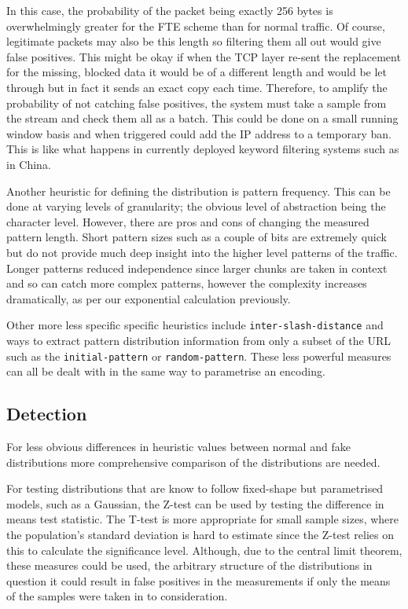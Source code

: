 \documentclass[ %
                    author={Samuel Russell},
                supervisor={Prof. Bogdan Warinschi},
                    degree={MEng},
                     title={Innocuous Ciphertexts},
                  subtitle={The DE-CENSOR Scheme},
                      type={research},
                      year={2018} ]{dissertation}
\begin{document}
In this case, the probability of the packet being exactly 256 bytes is overwhelmingly greater for the FTE scheme than for normal traffic.
Of course, legitimate packets may also be this length so filtering them all out would give false positives.
This might be okay if when the TCP layer re-sent the replacement for the missing, blocked data it would be of a different length and would be let through but in fact it sends an exact copy each time.
Therefore, to amplify the probability of not catching false positives, the system must take a sample from the stream and check them all as a batch.
This could be done on a small running window basis and when triggered could add the IP address to a temporary ban.
This is like what happens in currently deployed keyword filtering systems such as in China. 

Another heuristic for defining the distribution is pattern frequency.
This can be done at varying levels of granularity; the obvious level of abstraction being the character level. However, there are pros and cons of changing the measured pattern length.
Short pattern sizes such as a couple of bits are extremely quick but do not provide much deep insight into the higher level patterns of the traffic.
Longer patterns reduced independence since larger chunks are taken in context and so can catch more complex patterns, however the complexity increases dramatically, as per our exponential calculation previously.

Other more less specific specific heuristics include \texttt{inter-slash-distance} and ways to extract pattern distribution information from only a subset of the URL such as the \texttt{initial-pattern} or \texttt{random-pattern}. These less powerful measures can all be dealt with in the same way to parametrise an encoding.

\subsection{Detection}

For less obvious differences in heuristic values between normal and fake distributions more comprehensive comparison of the distributions are needed.

For testing distributions that are know to follow fixed-shape but parametrised models, such as a Gaussian, the Z-test can be used by testing the difference in means test statistic.
The T-test is more appropriate for small sample sizes, where the population's standard deviation is hard to estimate since the Z-test relies on this to calculate the significance level.
Although, due to the central limit theorem, these measures could be used, the arbitrary structure of the distributions in question it could result in false positives in the measurements if only the means of the samples were taken in to consideration.
\end{document}
